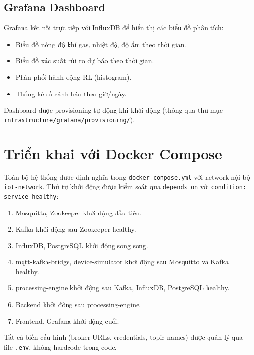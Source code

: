 \subsection{Grafana Dashboard}

Grafana kết nối trực tiếp với InfluxDB để hiển thị các biểu đồ phân tích:
\begin{itemize}
  \item Biểu đồ nồng độ khí gas, nhiệt độ, độ ẩm theo thời gian.
  \item Biểu đồ xác suất rủi ro dự báo theo thời gian.
  \item Phân phối hành động RL (histogram).
  \item Thống kê số cảnh báo theo giờ/ngày.
\end{itemize}

Dashboard được provisioning tự động khi khởi động (thông qua thư mục \texttt{infrastructure/grafana/provisioning/}).


\section{Triển khai với Docker Compose}

Toàn bộ hệ thống được định nghĩa trong \texttt{docker-compose.yml} với network nội bộ \texttt{iot-network}. Thứ tự khởi động được kiểm soát qua \texttt{depends\_on} với \texttt{condition: service\_healthy}:

\begin{enumerate}
  \item Mosquitto, Zookeeper khởi động đầu tiên.
  \item Kafka khởi động sau Zookeeper healthy.
  \item InfluxDB, PostgreSQL khởi động song song.
  \item mqtt-kafka-bridge, device-simulator khởi động sau Mosquitto và Kafka healthy.
  \item processing-engine khởi động sau Kafka, InfluxDB, PostgreSQL healthy.
  \item Backend khởi động sau processing-engine.
  \item Frontend, Grafana khởi động cuối.
\end{enumerate}

Tất cả biến cấu hình (broker URLs, credentials, topic names) được quản lý qua file \texttt{.env}, không hardcode trong code.

